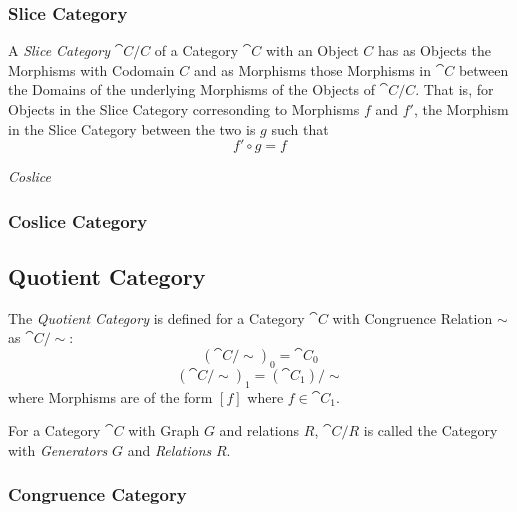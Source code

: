 \subsubsection{Slice Category}\label{sec:slice_category}

A \emph{Slice Category} $\cat{C}/C$ of a Category $\cat{C}$ with
an Object $C$ has as Objects the Morphisms with Codomain $C$ and as
Morphisms those Morphisms in $\cat{C}$ between the Domains of the
underlying Morphisms of the Objects of $\cat{C}/C$. That is, for
Objects in the Slice Category corresonding to Morphisms $f$ and $f'$,
the Morphism in the Slice Category between the two is $g$ such that
\[
  f' \circ g = f
\]

\emph{Coslice}



\subsubsection{Coslice Category}\label{sec:coslice_category}



\subsection{Quotient Category}\label{sec:quotient_category}


The \emph{Quotient Category} is defined for a Category $\cat{C}$
with Congruence Relation $\sim$ as $\cat{C}/\sim$:
\[
  (\cat{C}/\sim)_0 = \cat{C_0}
\]\[
  (\cat{C}/\sim)_1 = (\cat{C_1})/\sim
\]
where Morphisms are of the form $[f]$ where $f \in \cat{C_1}$.

For a Category $\cat{C}$ with Graph $G$ and relations $R$,
$\cat{C}/R$ is called the Category with \emph{Generators} $G$ and
\emph{Relations} $R$.



\subsubsection{Congruence Category}\label{sec:congruence_category}

